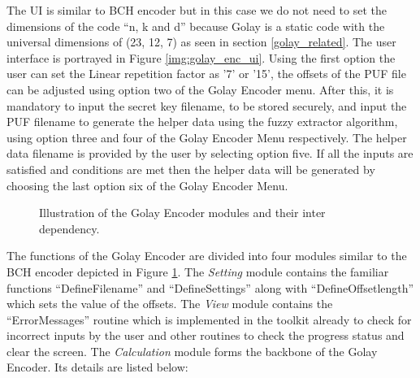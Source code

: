 	The UI is similar to BCH encoder but in this case we do not need to set the dimensions of the code ``n, k and d'' because Golay is a static code with the universal dimensions of (23, 12, 7) as seen in section \ref{golay_related}. The user interface is portrayed in Figure \ref{img:golay_enc_ui}. Using the first option the user can set the Linear repetition factor as '7' or '15', the offsets of the PUF file can be adjusted using option two of the Golay Encoder menu. After this, it is mandatory
	to input the secret key filename, to be
	stored securely, and input the PUF filename to generate the helper data using the fuzzy extractor algorithm, using option three and four of the Golay Encoder Menu respectively. The helper data filename is provided by the user by selecting option five. If all the inputs are satisfied and conditions are met then the helper data will be generated by choosing the last option six of the Golay Encoder Menu.\\

	\begin{figure}
	\centering
	\caption{Illustration of the Golay Encoder modules and their inter dependency.}
	\label{img:golay_enc_funcs}
	\end{figure}

	The functions of the Golay Encoder are divided into four modules similar to the BCH encoder depicted in Figure \ref{img:golay_enc_funcs}. The \emph{Setting} module contains the familiar functions ``DefineFilename'' and ``DefineSettings'' along with ``DefineOffsetlength'' which sets the value of the offsets. The \emph{View} module contains the ``ErrorMessages'' routine which is implemented in the toolkit already to check for incorrect inputs by the user and other routines to check the progress status and
	clear the screen. The \emph{Calculation} module forms the backbone of the Golay Encoder. Its details are listed below:

